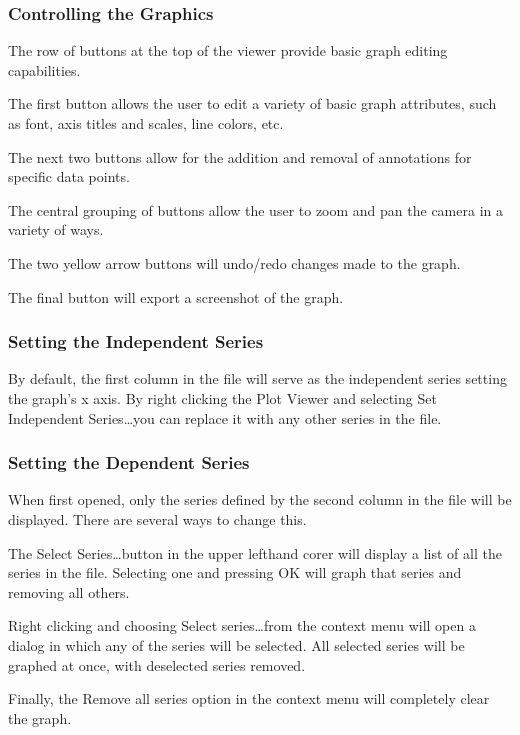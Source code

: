 \documentclass{article}
\begin{document}
\subsubsection{Controlling the Graphics}

The row of buttons at the top of the viewer provide basic graph editing
capabilities.

The first button allows the user to edit a variety of basic graph attributes,
such as font, axis titles and scales, line colors, etc.

The next two buttons allow for the addition and removal of annotations for
specific data points. 

The central grouping of buttons allow the user to zoom and pan the camera in a
variety of ways. 

The two yellow arrow buttons will undo/redo changes made to the graph.

The final button will export a screenshot of the graph.

\subsubsection{Setting the Independent Series}

By default, the first column in the file will serve as the independent series
setting the graph's x axis. By right clicking the Plot Viewer and selecting Set
Independent Series\ldots you can replace it with any other series in the file.

\subsubsection{Setting the Dependent Series}

When first opened, only the series defined by the second column in the file will
be displayed. There are several ways to change this. 

The Select Series\ldots button in the upper lefthand corer will display a list
of all the series in the file. Selecting one and pressing OK will graph that
series and removing all others.

Right clicking and choosing Select series\ldots from the context menu will open
a dialog in which any of the series will be selected. All selected series will
be graphed at once, with deselected series removed.

 

Finally, the Remove all series option in the context menu will completely clear
the graph.
\end{document}
